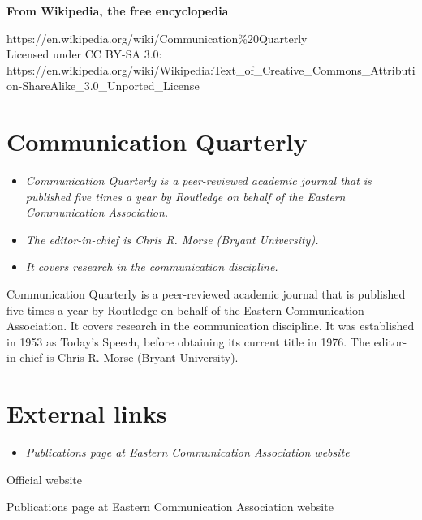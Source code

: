 \textbf{From Wikipedia, the free encyclopedia}

https://en.wikipedia.org/wiki/Communication\%20Quarterly\\
Licensed under CC BY-SA 3.0:\\
https://en.wikipedia.org/wiki/Wikipedia:Text\_of\_Creative\_Commons\_Attribution-ShareAlike\_3.0\_Unported\_License

\section{Communication Quarterly}\label{communication-quarterly}

\begin{itemize}
\item
  \emph{Communication Quarterly is a peer-reviewed academic journal that
  is published five times a year by Routledge on behalf of the Eastern
  Communication Association.}
\item
  \emph{The editor-in-chief is Chris R. Morse (Bryant University).}
\item
  \emph{It covers research in the communication discipline.}
\end{itemize}

Communication Quarterly is a peer-reviewed academic journal that is
published five times a year by Routledge on behalf of the Eastern
Communication Association. It covers research in the communication
discipline. It was established in 1953 as Today's Speech, before
obtaining its current title in 1976. The editor-in-chief is Chris R.
Morse (Bryant University).

\section{External links}\label{external-links}

\begin{itemize}
\item
  \emph{Publications page at Eastern Communication Association website}
\end{itemize}

Official website

Publications page at Eastern Communication Association website
